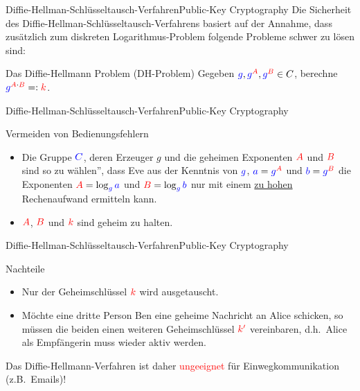 \documentclass{beamer}
\newcommand{\tb}[1]{{\textcolor{blue}{#1}}}
\newcommand{\tred}[1]{{\textcolor{red}{#1}}}
\theoremstyle{plain}
\begin{document}
\begin{frame}{Diffie-Hellman-Schlüsseltausch-Verfahren}{Public-Key Cryptography}
 Die Sicherheit des Diffie-Hellman-Schlüsseltausch-Verfahrens basiert auf der Annahme, dass zusätzlich zum diskreten Logarithmus-Problem folgende Probleme schwer zu lösen sind:
 \vspace{0.5cm}
 \pause
 \begin{block}{Das Diffie-Hellmann Problem (DH-Problem)}
  Gegeben $\tb g, \tb g^{\tred A}, \tb g^{\tred B} \in C$, berechne $\tb g^{\tred A \cdot \tred B} =: \tred k$.
 \end{block}

\end{frame}

\begin{frame}{Diffie-Hellman-Schlüsseltausch-Verfahren}{Public-Key Cryptography}
 \begin{block}{Vermeiden von Bedienungsfehlern}
  \begin{itemize}
   \item Die Gruppe $\tb C$, deren Erzeuger $g$ und die geheimen Exponenten $\tred A$ und $\tred B$ sind so zu \glqq wählen'', dass Eve aus der Kenntnis von $\tb g$, $\tb a = \tb g^{\tred{A}}$ und $\tb b = \tb g^{\tred{B}}$ die Exponenten $\tred A = \log_{\tb g} \tb a$ und $\tred B = \log_{\tb g} \tb b$ nur mit einem \underline{zu hohen} Rechenaufwand ermitteln kann.
   \item $\tred A$, $\tred B$ und $\tred k$ sind geheim zu halten.
  \end{itemize}
 \end{block}

\end{frame}

\begin{frame}{Diffie-Hellman-Schlüsseltausch-Verfahren}{Public-Key Cryptography}
 \begin{block}{Nachteile}
  \begin{itemize}
   \item Nur der Geheimschlüssel $\tred k$ wird ausgetauscht.
   \item Möchte eine dritte Person Ben eine geheime Nachricht an Alice schicken, so müssen die beiden einen weiteren Geheimschlüssel $\tred {k'}$ vereinbaren, d.h.~Alice als Empfängerin muss wieder aktiv werden.  
  \end{itemize}
 \end{block}
 \pause
 \vspace{0.5cm}
 
  \begin{center} Das Diffie-Hellmann-Verfahren ist daher \tred{ungeeignet} für Einwegkommunikation (z.B.~Emails)! \end{center}  
\end{frame}
\end{document}

